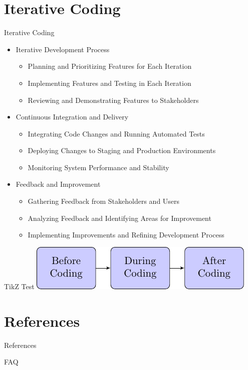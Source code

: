 \documentclass{beamer}
\begin{document}
\section{Iterative Coding}
\begin{frame}{Iterative Coding}
    \begin{itemize}
        \item Iterative Development Process
        \begin{itemize}
          \item Planning and Prioritizing Features for Each Iteration
          \item Implementing Features and Testing in Each Iteration
          \item Reviewing and Demonstrating Features to Stakeholders
      \end{itemize}
      \item Continuous Integration and Delivery
      \begin{itemize}
          \item Integrating Code Changes and Running Automated Tests
          \item Deploying Changes to Staging and Production Environments
          \item Monitoring System Performance and Stability
      \end{itemize}
      \item Feedback and Improvement
      \begin{itemize}
          \item Gathering Feedback from Stakeholders and Users
          \item Analyzing Feedback and Identifying Areas for Improvement
          \item Implementing Improvements and Refining Development Process
      \end{itemize}
  \end{itemize}
\end{frame}

\begin{frame}{TikZ Test}
  \includegraphics[width=\textwidth,height=0.8\textheight,keepaspectratio]{tikz-code-lifecycle.pdf}
\end{frame}




\section{References}
\begin{frame}[t,allowframebreaks]{References}
  \nocite{*}
  \RaggedRight
  \printbibliography
\end{frame}


\begin{frame}{FAQ}

\end{frame}
\end{document}
